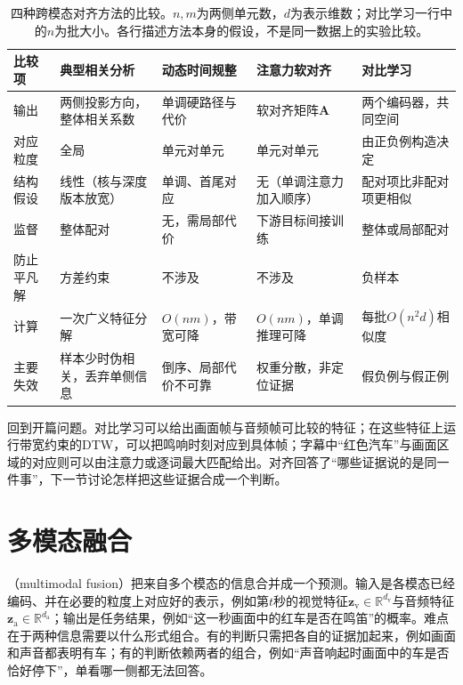 \begin{table}[tbp]
  \centering
  \small
  \begin{tabularx}{\linewidth}{@{}p{22mm}XXXX@{}}
    \toprule
    比较项 & 典型相关分析 & 动态时间规整 & 注意力软对齐 & 对比学习\\
    \midrule
    输出 & 两侧投影方向，整体相关系数 & 单调硬路径与代价 & 软对齐矩阵$\bm A$ & 两个编码器，共同空间\\
    对应粒度 & 全局 & 单元对单元 & 单元对单元 & 由正负例构造决定\\
    结构假设 & 线性（核与深度版本放宽） & 单调、首尾对应 & 无（单调注意力加入顺序） & 配对项比非配对项更相似\\
    监督 & 整体配对 & 无，需局部代价 & 下游目标间接训练 & 整体或局部配对\\
    防止平凡解 & 方差约束 & 不涉及 & 不涉及 & 负样本\\
    计算 & 一次广义特征分解 & $O(nm)$，带宽可降 & $O(nm)$，单调推理可降 & 每批$O(n^2d)$相似度\\
    主要失效 & 样本少时伪相关，丢弃单侧信息 & 倒序、局部代价不可靠 & 权重分散，非定位证据 & 假负例与假正例\\
    \bottomrule
  \end{tabularx}
  \caption{四种跨模态对齐方法的比较。$n,m$为两侧单元数，$d$为表示维数；对比学习一行中的$n$为批大小。各行描述方法本身的假设，不是同一数据上的实验比较。}
  \label{tab:vision-alignment-methods}
\end{table}

回到开篇问题。对比学习可以给出画面帧与音频帧可比较的特征；在这些特征上运行带宽约束的DTW，可以把鸣响时刻对应到具体帧；字幕中“红色汽车”与画面区域的对应则可以由注意力或逐词最大匹配给出。对齐回答了“哪些证据说的是同一件事”，下一节讨论怎样把这些证据合成一个判断。

\section{多模态融合}
\label{sec:vision-alignment-fusion}

（multimodal fusion）把来自多个模态的信息合并成一个预测。输入是各模态已经编码、并在必要的粒度上对应好的表示，例如第$t$秒的视觉特征$\bm z_{\mathrm v}\in\mathbb R^{d_{\mathrm v}}$与音频特征$\bm z_{\mathrm a}\in\mathbb R^{d_{\mathrm a}}$；输出是任务结果，例如“这一秒画面中的红车是否在鸣笛”的概率。难点在于两种信息需要以什么形式组合。有的判断只需把各自的证据加起来，例如画面和声音都表明有车；有的判断依赖两者的组合，例如“声音响起时画面中的车是否恰好停下”，单看哪一侧都无法回答。

